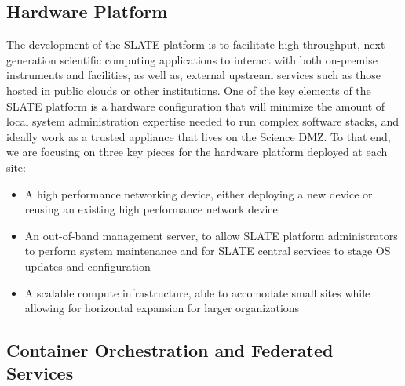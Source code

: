 \documentclass[sigconf]{acmart}
\begin{document}
\subsection{Hardware Platform}
The development of the SLATE platform is to facilitate high-throughput, next generation scientific computing applications to interact with both on-premise instruments and facilities, as well as, external upstream services such as those hosted in public clouds or other institutions. One of the key elements of the SLATE platform is a hardware configuration that will minimize the amount of local system administration expertise needed to run complex software stacks, and ideally work as a trusted appliance that lives on the Science DMZ. To that end, we are focusing on three key pieces for the hardware platform deployed at each site:
\begin{itemize}
\item A high performance networking device, either deploying a new device or reusing an existing high performance network device
\item An out-of-band management server, to allow SLATE platform administrators to perform system maintenance and for SLATE central services to stage OS updates and configuration 
\item A scalable compute infrastructure, able to accomodate small sites while allowing for horizontal expansion for larger organizations
\end{itemize}



%

\subsection{Container Orchestration and Federated Services}
\end{document}
